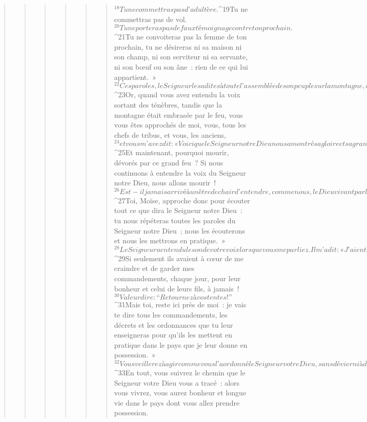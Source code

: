 \begin{verse}
\begin{verse}
\begin{verse}
\begin{verse}
\begin{verse}
\begin{verse}
${}^{18}Tu ne commettras pas d’adultère.
${}^{19}Tu ne commettras pas de vol.
${}^{20}Tu ne porteras pas de faux témoignage contre ton prochain.
${}^{21}Tu ne convoiteras pas la femme de ton prochain, tu ne désireras ni sa maison ni son champ, ni son serviteur ni sa servante, ni son bœuf ou son âne : rien de ce qui lui appartient. »
${}^{22}Ces paroles, le Seigneur les a dites à toute l’assemblée de son peuple sur la montagne, du milieu du feu, des nuages et de la nuée obscure ; il les a dites d’une voix puissante et n’a rien ajouté. Ensuite il les a écrites sur deux tables de pierre, qu’il m’a données.
${}^{23}Or, quand vous avez entendu la voix sortant des ténèbres, tandis que la montagne était embrasée par le feu, vous vous êtes approchés de moi, vous, tous les chefs de tribus, et vous, les anciens, 
${}^{24}et vous m’avez dit : « Voici que le Seigneur notre Dieu nous a montré sa gloire et sa grandeur ; nous avons entendu sa voix du milieu du feu ; aujourd’hui, nous avons vu que Dieu peut parler à l’homme et lui laisser la vie. 
${}^{25}Et maintenant, pourquoi mourir, dévorés par ce grand feu ? Si nous continuons à entendre la voix du Seigneur notre Dieu, nous allons mourir ! 
${}^{26}Est-il jamais arrivé à un être de chair d’entendre, comme nous, le Dieu vivant parler du milieu du feu et, malgré tout, de rester en vie ? 
${}^{27}Toi, Moïse, approche donc pour écouter tout ce que dira le Seigneur notre Dieu : tu nous répéteras toutes les paroles du Seigneur notre Dieu ; nous les écouterons et nous les mettrons en pratique. »
${}^{28}Le Seigneur a entendu le son de votre voix lorsque vous me parliez. Il m’a dit : « J’ai entendu résonner la voix de ce peuple lorsqu’il te parlait : ils ont bien fait de dire tout cela ! 
${}^{29}Si seulement ils avaient à cœur de me craindre et de garder mes commandements, chaque jour, pour leur bonheur et celui de leurs fils, à jamais ! 
${}^{30}Va leur dire : “Retournez à vos tentes !” 
${}^{31}Mais toi, reste ici près de moi : je vais te dire tous les commandements, les décrets et les ordonnances que tu leur enseigneras pour qu’ils les mettent en pratique dans le pays que je leur donne en possession. »
${}^{32}Vous veillerez à agir comme vous l’a ordonné le Seigneur votre Dieu, sans dévier ni à droite ni à gauche. 
${}^{33}En tout, vous suivrez le chemin que le Seigneur votre Dieu vous a tracé : alors vous vivrez, vous aurez bonheur et longue vie dans le pays dont vous allez prendre possession.
      

\end{verse}
\end{verse}
\end{verse}
\end{verse}
\end{verse}
\end{verse}
